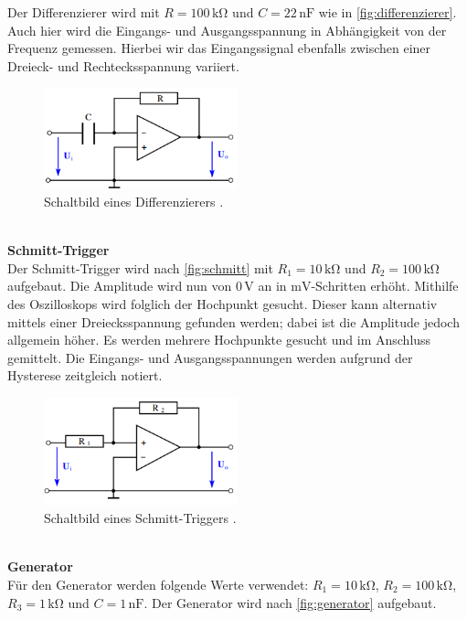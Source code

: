Der Differenzierer wird mit $R=100\,\unit{\kilo\ohm}$ und $C=22\,\text{nF}$ wie in \autoref{fig:differenzierer}.
Auch hier wird die Eingangs- und Ausgangsspannung in Abhängigkeit von der Frequenz gemessen. Hierbei wir das Eingangssignal 
ebenfalls zwischen einer Dreieck- und Rechtecksspannung variiert.\\
\begin{figure}
    \centering
    \includegraphics[width=0.5\textwidth]{differenzierer.png}
    \caption{Schaltbild eines Differenzierers \cite{ap51}.}
    \label{fig:differenzierer}
\end{figure}
\\
\textbf{Schmitt-Trigger}\\
Der Schmitt-Trigger wird nach \autoref{fig:schmitt} mit $R_1 = 10\,\unit{\kilo\ohm}$ und
$R_2=100\,\unit{\kilo\ohm}$ aufgebaut. Die Amplitude wird nun von $0\,\unit{\volt}$ an in $\unit{\milli\volt}$-Schritten 
erhöht. Mithilfe des Oszilloskops wird folglich der Hochpunkt gesucht. Dieser kann alternativ mittels einer 
Dreiecksspannung gefunden werden; dabei ist die Amplitude jedoch allgemein höher. Es werden mehrere Hochpunkte gesucht und im Anschluss gemittelt. 
Die Eingangs- und Ausgangsspannungen werden aufgrund der Hysterese zeitgleich notiert. \\
\begin{figure}
    \centering
    \includegraphics[width=0.5\textwidth]{schmitt.png}
    \caption{Schaltbild eines Schmitt-Triggers \cite{ap51}.}
    \label{fig:schmitt}
\end{figure}
\\
\textbf{Generator}\\
Für den Generator werden folgende Werte verwendet: $R_1= 10\,\unit{\kilo\ohm}$, $R_2=100\,\unit{\kilo\ohm}$,
$R_3=1\,\unit{\kilo\ohm}$ und $C=1\,\text{nF}$. Der Generator wird nach \autoref{fig:generator} aufgebaut. 
